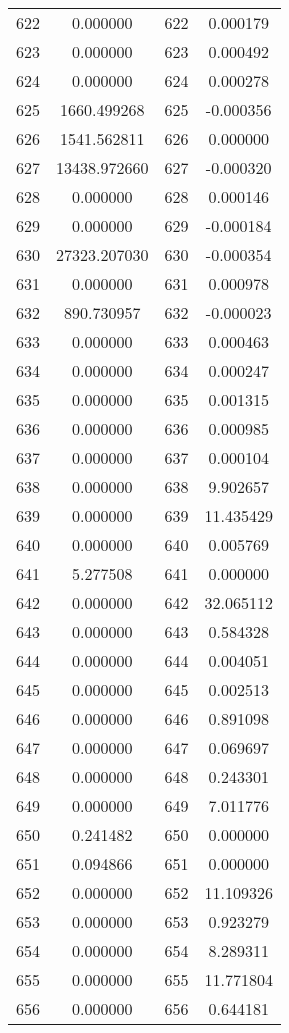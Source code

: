 \documentclass[12pt]{article}
\begin{document}
\begin{longtable}{@{}cccc@{}}
622 & 0.000000 & 622 & 0.000179 \\
623 & 0.000000 & 623 & 0.000492 \\
624 & 0.000000 & 624 & 0.000278 \\
625 & 1660.499268 & 625 & -0.000356 \\
626 & 1541.562811 & 626 & 0.000000 \\
627 & 13438.972660 & 627 & -0.000320 \\
628 & 0.000000 & 628 & 0.000146 \\
629 & 0.000000 & 629 & -0.000184 \\
630 & 27323.207030 & 630 & -0.000354 \\
631 & 0.000000 & 631 & 0.000978 \\
632 & 890.730957 & 632 & -0.000023 \\
633 & 0.000000 & 633 & 0.000463 \\
634 & 0.000000 & 634 & 0.000247 \\
635 & 0.000000 & 635 & 0.001315 \\
636 & 0.000000 & 636 & 0.000985 \\
637 & 0.000000 & 637 & 0.000104 \\
638 & 0.000000 & 638 & 9.902657 \\
639 & 0.000000 & 639 & 11.435429 \\
640 & 0.000000 & 640 & 0.005769 \\
641 & 5.277508 & 641 & 0.000000 \\
642 & 0.000000 & 642 & 32.065112 \\
643 & 0.000000 & 643 & 0.584328 \\
644 & 0.000000 & 644 & 0.004051 \\
645 & 0.000000 & 645 & 0.002513 \\
646 & 0.000000 & 646 & 0.891098 \\
647 & 0.000000 & 647 & 0.069697 \\
648 & 0.000000 & 648 & 0.243301 \\
649 & 0.000000 & 649 & 7.011776 \\
650 & 0.241482 & 650 & 0.000000 \\
651 & 0.094866 & 651 & 0.000000 \\
652 & 0.000000 & 652 & 11.109326 \\
653 & 0.000000 & 653 & 0.923279 \\
654 & 0.000000 & 654 & 8.289311 \\
655 & 0.000000 & 655 & 11.771804 \\
656 & 0.000000 & 656 & 0.644181 \\

\end{longtable}
\end{document}
